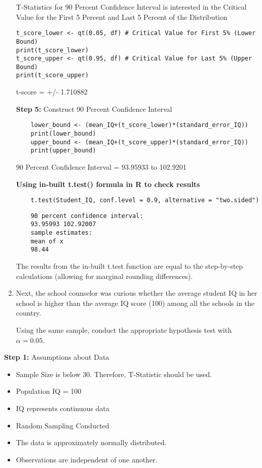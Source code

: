 \documentclass[12pt,letterpaper]{article}
\begin{document}
\begin{enumerate}
T-Statistics for 90 Percent Confidence Interval is interested in the Critical Value for the First 5 Percent and Last 5 Percent of the Distribution 
\begin{verbatim}
t_score_lower <- qt(0.05, df) # Critical Value for First 5% (Lower Bound)
print(t_score_lower)
t_score_upper <- qt(0.95, df) # Critical Value for Last 5% (Upper Bound)
print(t_score_upper)
\end{verbatim}
t-score = +/- 1.710882


\textbf{Step 5: }Construct 90 Percent Confidence Interval 
\begin{verbatim}
	lower_bound <- (mean_IQ+(t_score_lower)*(standard_error_IQ))
	print(lower_bound)
	upper_bound <- (mean_IQ+(t_score_upper)*(standard_error_IQ))
	print(upper_bound)
\end{verbatim}

90 Percent Confidence Interval = 93.95933 to 102.9201


\textbf{Using in-built t.test() formula in R to check results}
\begin{verbatim}
	t.test(Student_IQ, conf.level = 0.9, alternative = "two.sided")
\end{verbatim}
\begin{verbatim}
	90 percent confidence interval:
	93.95993 102.92007
	sample estimates:
	mean of x 
	98.44 
\end{verbatim}
The results from the in-built t.test function are equal to the step-by-step calculations (allowing for marginal rounding differences).  
	\item Next, the school counselor was curious  whether  the average student IQ in her school is higher than the average IQ score (100) among all the schools in the country. 
	
	\noindent Using the same sample, conduct the appropriate hypothesis test with $\alpha=0.05$.
\end{enumerate}
\textbf{Step 1:} Assumptions about Data
\begin{itemize}
\item
Sample Size is below 30. Therefore, T-Statistic should be used.
\item 
Population IQ = 100
\item
IQ represents continuous data
\item
Random Sampling Conducted
\item
The data is approximately normally distributed. 
\item
Observations are independent of one another. 
\end{itemize}
\end{document}

